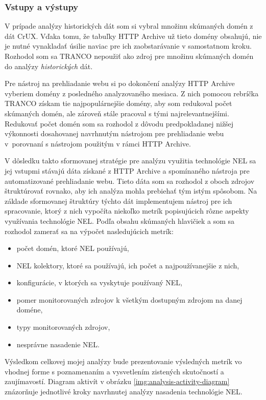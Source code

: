 \subsubsection{Vstupy a výstupy}

V prípade analýzy historických dát som si vybral množinu skúmaných domén z dát CrUX. 
Vďaka tomu, že tabuľky HTTP Archive už tieto domény obsahujú, nie je nutné vynakladať úsilie naviac pre ich zaobstarávanie v samostatnom kroku. 
Rozhodol som sa TRANCO nepoužiť ako zdroj pre množinu skúmaných domén do analýzy \textit{historických} dát.

Pre nástroj na prehliadanie webu si po dokončení analýzy HTTP Archive vyberiem domény z posledného analyzovaného mesiaca. 
Z nich pomocou rebríčka TRANCO získam tie najpopulárnejšie domény, aby som redukoval počet skúmaných domén, ale zároveň stále pracoval s tými najrelevantnejšími.
Redukovať počet domén som sa rozhodol z dôvodu predpokladanej nižšej výkonnosti dosahovanej navrhnutým nástrojom pre prehliadanie webu \mbox{v porovnaní} s nástrojom použitým v rámci HTTP Archive. 

V dôsledku takto sformovanej stratégie pre analýzu využitia technológie NEL sa jej vstupmi stávajú dáta získané z HTTP Archive a spomínaného nástroja pre automatizované prehliadanie webu.
Tieto dáta som sa rozhodol z oboch zdrojov štruktúrovať rovnako, aby ich analýza mohla prebiehať tým istým spôsobom.
Na základe sformovanej štruktúry týchto dát implementujem nástroj pre ich spracovanie, ktorý z nich vypočíta niekoľko metrík popisujúcich rôzne aspekty využívania technológie NEL.
Podľa obsahu skúmaných hlavičiek  a  som sa rozhodol zamerať sa na výpočet nasledujúcich metrík:
\begin{itemize}
    \item počet domén, ktoré NEL používajú,
    \item NEL kolektory, ktoré sa používajú, ich počet a najpoužívanejšie z nich,
    \item konfigurácie, v ktorých sa vyskytuje používaný NEL,
    \item pomer monitorovaných zdrojov k všetkým dostupným zdrojom na danej doméne,
    \item typy monitorovaných zdrojov,
    \item nesprávne nasadenie NEL.
\end{itemize}

Výsledkom celkovej mojej analýzy bude prezentovanie výsledných metrík vo vhodnej forme s poznamenaním a vysvetlením zistených skutočností a zaujímavostí. 
Diagram aktivít v obrázku \ref{img:analysis-activity-diagram} znázorňuje jednotlivé kroky navrhnutej analýzy nasadenia technológie NEL. 

